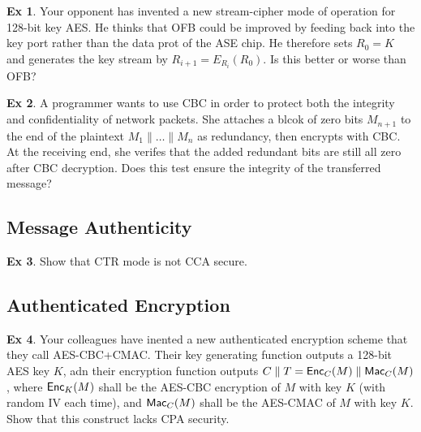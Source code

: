 \documentclass[10pt,\jkfside,a4paper]{article}
\theoremstyle{definition}
\newtheorem{ex}{Ex}
\begin{document}

\begin{ex}

    Your opponent has invented a new stream-cipher mode of operation for 128-bit key AES. He thinks that OFB could be improved by feeding back into the key port rather than the data prot of the ASE chip. He therefore sets $R_0 = K$ and generates the key stream by $R_{i + 1} = E_{R_i}(R_0)$. Is this better or worse than OFB?

\end{ex}


\begin{ex}

    A programmer wants to use CBC in order to protect both the integrity and confidentiality of network packets. She attaches a blcok of zero bits $M_{n + 1}$ to the end of the plaintext $M_1 \parallel \ldots \parallel M_n$ as redundancy, then encrypts with CBC. At the receiving end, she verifes that the added redundant bits are still all zero after CBC decryption. Does this test ensure the integrity of the transferred message?

\end{ex}


\subsection{Message Authenticity}

\begin{ex}

    Show that CTR mode is not CCA secure.

\end{ex}


\subsection{Authenticated Encryption}

\begin{ex}

    Your colleagues have inented a new authenticated encryption scheme that they call AES-CBC+CMAC. Their key generating function outputs a 128-bit AES key $K$, adn their encryption function outputs $C\parallel T = \mathsf{Enc}_C(M)\parallel\mathsf{Mac}_C(M)$, where $\mathsf{Enc}_K(M)$ shall be the AES-CBC encryption of $M$ with key $K$ (with random IV each time), and $\mathsf{Mac}_C(M)$ shall be the AES-CMAC of $M$ with key $K$. Show that this construct lacks CPA security.

\end{ex}
\end{document}
